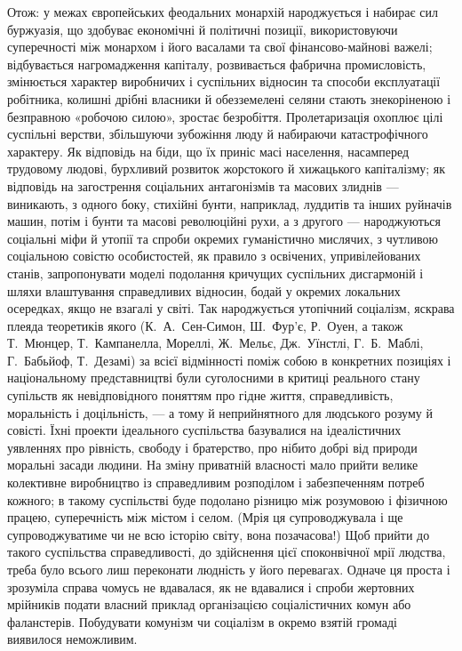 Отож: у межах європейських феодальних монархій народжується і набирає 
сил буржуазія, що здобуває економічні й політичні позиції, 
використовуючи суперечності між монархом і його васалами та свої 
фінансово-майнові важелі; відбувається нагромадження капіталу, 
розвивається фабрична промисловість, змінюється характер виробничих 
і суспільних відносин та способи експлуатації робітника, колишні 
дрібні власники й обезземелені селяни стають знекоріненою і 
безправною «робочою силою», зростає безробіття. Пролетаризація 
охоплює цілі суспільні верстви, збільшуючи зубожіння люду й набираючи 
катастрофічного характеру. Як відповідь на біди, що їх приніс масі 
населення, насамперед трудовому людові, бурхливий розвиток 
жорстокого й хижацького капіталізму; як відповідь на загострення 
соціальних антагонізмів та масових злиднів — виникають, з одного 
боку, стихійні бунти, наприклад, луддитів та інших руйначів машин, 
потім і бунти та масові революційні рухи, а з другого — народжуються 
соціальні міфи й утопії та спроби окремих гуманістично мислячих, з 
чутливою соціальною совістю особистостей, як правило з освічених, 
упривілейованих станів, запропонувати моделі подолання кричущих 
суспільних дисгармоній і шляхи влаштування справедливих відносин, 
бодай у окремих локальних осередках, якщо не взагалі у світі. Так 
народжується утопічний соціалізм, яскрава плеяда теоретиків якого 
(К.~А.~Сен-Симон, Ш.~Фур'є, Р.~Оуен, а також Т.~Мюнцер, Т.~Кампанелла, Мореллі, 
Ж.~Мельє, Дж.~Уїнстлі, Г.~Б.~Маблі, Г.~Бабьйоф, Т.~Дезамі) за всієї відмінності 
поміж собою в конкретних позиціях і національному представництві 
були суголосними в критиці реального стану супільств як 
невідповідного поняттям про гідне життя, справедливість, моральність 
і доцільність, — а тому й неприйнятного для людського розуму й 
совісті. Їхні проекти ідеального суспільства базувалися на 
ідеалістичних уявленнях про рівність, свободу і братерство, про 
нібито добрі від природи моральні засади людини. На зміну приватній 
власності мало прийти велике колективне виробництво із справедливим 
розподілом і забезпеченням потреб кожного; в такому суспільстві буде 
подолано різницю між розумовою і фізичною працею, суперечність між 
містом і селом. (Мрія ця супроводжувала і ще супроводжуватиме чи не всю 
історію світу, вона позачасова!) Щоб прийти до такого суспільства 
справедливості, до здійснення цієї споконвічної мрії людства, треба 
було всього лиш переконати людність у його перевагах. Одначе ця проста 
і зрозуміла справа чомусь не вдавалася, як не вдавалися і спроби 
жертовних мрійників подати власний приклад організацією 
соціалістичних комун або фаланстерів. Побудувати комунізм чи 
соціалізм в окремо взятій громаді виявилося неможливим.


